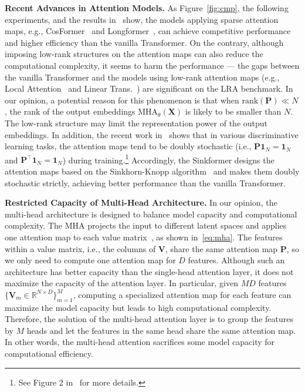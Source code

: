 \textbf{Recent Advances in Attention Models.}
As Figure~\ref{fig:cmp}, the following experiments, and the results in~\cite{beltagy2020longformer,gu2021efficiently,zhen2022cosformer,ma2022mega} show, the models applying sparse attention maps, e.g., CosFormer~\cite{zhen2022cosformer} and Longformer~\cite{beltagy2020longformer}, can achieve competitive performance and higher efficiency than the vanilla Transformer. 
On the contrary, although imposing low-rank structures on the attention maps can also reduce the computational complexity, it seems to harm the performance --- the gaps between the vanilla Transformer and the models using low-rank attention maps (e.g., Local Attention~\cite{tay2021long} and Linear Trans.~\cite{katharopoulos2020transformers}) are significant on the LRA benchmark. 
In our opinion, a potential reason for this phenomenon is that when $\text{rank}(\bm{P})\ll N$, the rank of the output embeddings $\text{MHA}_{\theta}(\bm{X})$ is likely to be smaller than $N$. 
The low-rank structure may limit the representation power of the output embeddings. 
In addition, the recent work in~\cite{sander2022sinkformers} shows that in various discriminative learning tasks, the attention maps tend to be doubly stochastic (i.e., $\bm{P}\bm{1}_N=\bm{1}_N$ and $\bm{P}^{\top}\bm{1}_N=\bm{1}_N$) during training.\footnote{See Figure 2 in~\cite{sander2022sinkformers} for more details.} 
Accordingly, the Sinkformer designs the attention maps based on the Sinkhorn-Knopp algorithm~\cite{sinkhorn1967concerning} and makes them doubly stochastic strictly, achieving better performance than the vanilla Transformer. 

\textbf{Restricted Capacity of Multi-Head Architecture.}
In our opinion, the multi-head architecture is designed to balance model capacity and computational complexity. 
The MHA projects the input to different latent spaces and applies one attention map to each value matrix~\cite{vaswani2017attention}, as shown in~\eqref{eq:mha}. 
The features within a value matrix, i.e., the columns of $\bm{V}$, share the same attention map $\bm{P}$, so we only need to compute one attention map for $D$ features. 
Although such an architecture has better capacity than the single-head attention layer, it does not maximize the capacity of the attention layer.  
In particular, given $MD$ features $\{\bm{V}_m\in\mathbb{R}^{N\times D}\}_{m=1}^{M}$, computing a specialized attention map for each feature can maximize the model capacity but leads to high computational complexity.
Therefore, the solution of the multi-head attention layer is to group the features by $M$ heads and let the features in the same head share the same attention map. 
In other words, the multi-head attention sacrifices some model capacity for computational efficiency.




